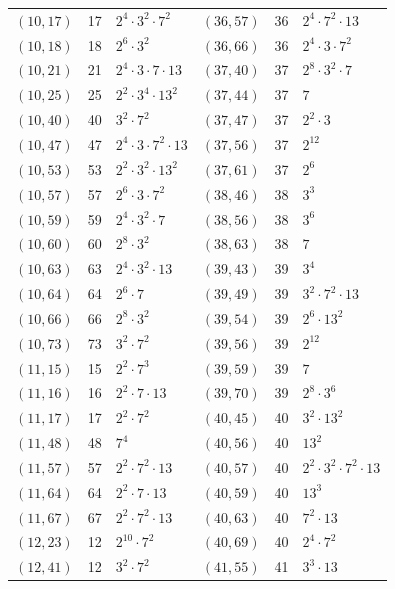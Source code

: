 \documentclass[11pt]{article}
\begin{document}
\begin{longtable}{@{}lrl@{\qquad}lrl@{}}
$(10,17)$ & 17 & $2^{4}\cdot 3^{2}\cdot 7^{2}$ & $(36,57)$ & 36 & $2^{4}\cdot 7^{2}\cdot 13$\\
$(10,18)$ & 18 & $2^{6}\cdot 3^{2}$ & $(36,66)$ & 36 & $2^{4}\cdot 3\cdot 7^{2}$\\
$(10,21)$ & 21 & $2^{4}\cdot 3\cdot 7\cdot 13$ & $(37,40)$ & 37 & $2^{8}\cdot 3^{2}\cdot 7$\\
$(10,25)$ & 25 & $2^{2}\cdot 3^{4}\cdot 13^{2}$ & $(37,44)$ & 37 & $7$\\
$(10,40)$ & 40 & $3^{2}\cdot 7^{2}$ & $(37,47)$ & 37 & $2^{2}\cdot 3$\\
$(10,47)$ & 47 & $2^{4}\cdot 3\cdot 7^{2}\cdot 13$ & $(37,56)$ & 37 & $2^{12}$\\
$(10,53)$ & 53 & $2^{2}\cdot 3^{2}\cdot 13^{2}$ & $(37,61)$ & 37 & $2^{6}$\\
$(10,57)$ & 57 & $2^{6}\cdot 3\cdot 7^{2}$ & $(38,46)$ & 38 & $3^{3}$\\
$(10,59)$ & 59 & $2^{4}\cdot 3^{2}\cdot 7$ & $(38,56)$ & 38 & $3^{6}$\\
$(10,60)$ & 60 & $2^{8}\cdot 3^{2}$ & $(38,63)$ & 38 & $7$\\
$(10,63)$ & 63 & $2^{4}\cdot 3^{2}\cdot 13$ & $(39,43)$ & 39 & $3^{4}$\\
$(10,64)$ & 64 & $2^{6}\cdot 7$ & $(39,49)$ & 39 & $3^{2}\cdot 7^{2}\cdot 13$\\
$(10,66)$ & 66 & $2^{8}\cdot 3^{2}$ & $(39,54)$ & 39 & $2^{6}\cdot 13^{2}$\\
$(10,73)$ & 73 & $3^{2}\cdot 7^{2}$ & $(39,56)$ & 39 & $2^{12}$\\
$(11,15)$ & 15 & $2^{2}\cdot 7^{3}$ & $(39,59)$ & 39 & $7$\\
$(11,16)$ & 16 & $2^{2}\cdot 7\cdot 13$ & $(39,70)$ & 39 & $2^{8}\cdot 3^{6}$\\
$(11,17)$ & 17 & $2^{2}\cdot 7^{2}$ & $(40,45)$ & 40 & $3^{2}\cdot 13^{2}$\\
$(11,48)$ & 48 & $7^{4}$ & $(40,56)$ & 40 & $13^{2}$\\
$(11,57)$ & 57 & $2^{2}\cdot 7^{2}\cdot 13$ & $(40,57)$ & 40 & $2^{2}\cdot 3^{2}\cdot 7^{2}\cdot 13$\\
$(11,64)$ & 64 & $2^{2}\cdot 7\cdot 13$ & $(40,59)$ & 40 & $13^{3}$\\
$(11,67)$ & 67 & $2^{2}\cdot 7^{2}\cdot 13$ & $(40,63)$ & 40 & $7^{2}\cdot 13$\\
$(12,23)$ & 12 & $2^{10}\cdot 7^{2}$ & $(40,69)$ & 40 & $2^{4}\cdot 7^{2}$\\
$(12,41)$ & 12 & $3^{2}\cdot 7^{2}$ & $(41,55)$ & 41 & $3^{3}\cdot 13$\\

\end{longtable}
\end{document}
